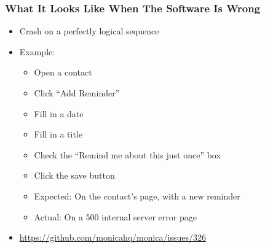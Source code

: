 \begin{frame}
  \frametitle{What It Looks Like When The Software Is Wrong}
  \begin{itemize}
    \item Crash on a perfectly logical sequence
    \item Example:
    \begin{itemize}
      \item Open a contact
      \item Click ``Add Reminder''
      \item Fill in a date
      \item Fill in a title
      \item Check the ``Remind me about this just once'' box
      \item Click the save button
      \item Expected: On the contact's page, with a new reminder
      \item Actual: On a 500 internal server error page
    \end{itemize}
    \item \url{https://github.com/monicahq/monica/issues/326}
  \end{itemize}
\end{frame}
